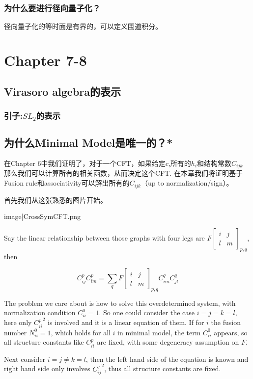 \subsubsection{为什么要进行径向量子化？}
径向量子化的等时面是有界的，可以定义围道积分。
\section{Chapter 7-8}
\subsection{Virasoro algebra的表示}
\subsubsection{引子:$SL_2$的表示}
\subsection{为什么Minimal Model是唯一的？*}
在Chapter 6中我们证明了，对于一个CFT，如果给定$c$,所有的$h_i$和结构常数$C_{ijk}$
那么我们可以计算所有的相关函数，从而决定这个CFT.
在本章我们将证明基于Fusion rule和associativity可以解出所有的$C_{ijk}$（up to normalization/sign）。

首先我们从这张熟悉的图片开始。
\begin{center}	
{{image|CrossSymCFT.png}}
\end{center}

Say the linear relationship between those graphs with four legs are $F\begin{bmatrix}
i&j \\
l&m
\end{bmatrix}_{p,q}$, then

$$C_{ij}^pC_{lm}^p=\sum_q F\begin{bmatrix}
i&j \\
l&m
\end{bmatrix}_{p,q}C_{im}^qC_{jl}^q$$

The problem we care about is how to solve this overdetermined system, with normalization condition $C_{ii}^{0}=1$. So one could consider the case $i=j=k=l$, here only ${C_{ii}^p}^2$ is involved and it is a linear equation of them. If for $i$ the fusion number $N_{ii}^0=1$, which holds for all $i$ in  minimal model, the term $C_{ii}^{0}$ appears, so all structure constants like $C_{ii}^p$ are fixed, with some degeneracy assumption on $F$.

Next consider $i=j\not=k=l$, then the left hand side of the equation is known and right hand side only involves ${C_{ij}^q}^2$, thus all structure constants are fixed.

